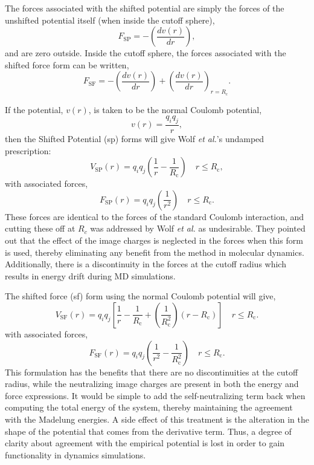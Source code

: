 \documentclass[]{book}
\begin{document}
The forces associated with the shifted potential are simply the forces
of the unshifted potential itself (when inside the cutoff sphere),
\begin{equation}
F_{\textrm{SP}} = -\left( \frac{d v(r)}{dr} \right),
\end{equation}
and are zero outside.  Inside the cutoff sphere, the forces associated
with the shifted force form can be written,
\begin{equation}
F_{\textrm{SF}} = -\left( \frac{d v(r)}{dr} \right) + \left(\frac{d
v(r)}{dr} \right)_{r=R_\textrm{c}}.
\end{equation}
 
If the potential, $v(r)$, is taken to be the normal Coulomb potential,
\begin{equation}
v(r) = \frac{q_i q_j}{r},
\label{eq:Coulomb}
\end{equation}
then the Shifted Potential ({\sc sp}) forms will give Wolf {\it et
al.}'s undamped prescription:
\begin{equation}
V_\textrm{SP}(r) =
q_iq_j\left(\frac{1}{r}-\frac{1}{R_\textrm{c}}\right) \quad
r\leqslant R_\textrm{c},
\label{eq:SPPot}
\end{equation}
with associated forces,
\begin{equation}
F_\textrm{SP}(r) = q_iq_j\left(\frac{1}{r^2}\right) \quad r\leqslant R_\textrm{c
}.
\label{eq:SPForces}
\end{equation}
These forces are identical to the forces of the standard Coulomb
interaction, and cutting these off at $R_c$ was addressed by Wolf
\textit{et al.} as undesirable.  They pointed out that the effect of
the image charges is neglected in the forces when this form is
used,\cite{Wolf99} thereby eliminating any benefit from the method in
molecular dynamics.  Additionally, there is a discontinuity in the
forces at the cutoff radius which results in energy drift during MD
simulations.

The shifted force ({\sc sf}) form using the normal Coulomb potential
will give,
\begin{equation}
V_\textrm{SF}(r) = q_iq_j\left[\frac{1}{r}-\frac{1}{R_\textrm{c}}+\left(\frac{1}
{R_\textrm{c}^2}\right)(r-R_\textrm{c})\right] \quad r\leqslant R_\textrm{c}.
\label{eq:SFPot}
\end{equation}
with associated forces,
\begin{equation}
F_\textrm{SF}(r) =  q_iq_j\left(\frac{1}{r^2}-\frac{1}{R_\textrm{c}^2}\right) \quad r\leqslant R_\textrm{c}.
\label{eq:SFForces}
\end{equation}
This formulation has the benefits that there are no discontinuities at
the cutoff radius, while the neutralizing image charges are present in
both the energy and force expressions.  It would be simple to add the
self-neutralizing term back when computing the total energy of the
system, thereby maintaining the agreement with the Madelung energies.
A side effect of this treatment is the alteration in the shape of the
potential that comes from the derivative term.  Thus, a degree of
clarity about agreement with the empirical potential is lost in order
to gain functionality in dynamics simulations.
\end{document}
